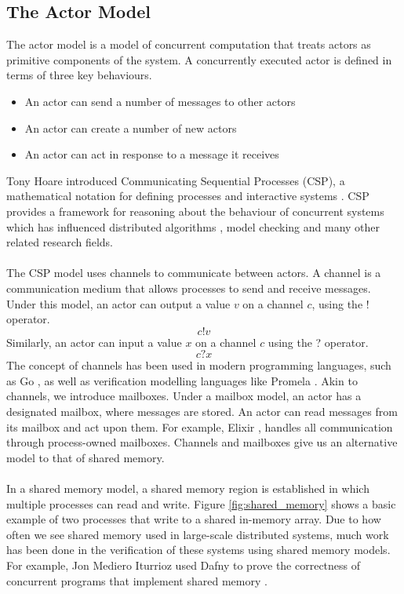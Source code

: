\subsection{The Actor Model}
The actor model \cite{actors} is a model of concurrent computation that treats actors as primitive components of the system. A concurrently executed actor is defined in terms of three key behaviours.
\begin{itemize}
    \item An actor can send a number of messages to other actors
    \item An actor can create a number of new actors
    \item An actor can act in response to a message it receives
\end{itemize}
Tony Hoare introduced Communicating Sequential Processes (CSP), a mathematical notation for defining processes and interactive systems \cite{csp_paper}. CSP provides a framework for reasoning about the behaviour of concurrent systems which has influenced distributed algorithms \cite{distributed_algorithms_na_lynch}, model checking \cite{model_checking} and many other related research fields.
\\ \\
The CSP model uses channels to communicate between actors. A channel is a communication medium that allows processes to send and receive messages. Under this model, an actor can output a value $v$ on a channel $c$, using the ! operator.
\[
c!v
\]
Similarly, an actor can input a value $x$ on a channel $c$ using the ? operator.
\[
c?x
\]
The concept of channels has been used in modern programming languages, such as Go \cite{go}, as well as verification modelling languages like Promela \cite{promela}. Akin to channels, we introduce mailboxes. Under a mailbox model, an actor has a designated mailbox, where messages are stored. An actor can read messages from its mailbox and act upon them. For example, Elixir \cite{elixir}, handles all communication through process-owned mailboxes. Channels and mailboxes give us an alternative model to that of shared memory.
\\ \\
In a shared memory model, a shared memory region is established in which multiple processes can read and write. Figure \ref{fig:shared_memory} shows a basic example of two processes that write to a shared in-memory array. Due to how often we see shared memory used in large-scale distributed systems, much work has been done in the verification of these systems using shared memory models. For example, Jon Mediero Iturrioz used Dafny \cite{dafny} to prove the correctness of concurrent programs that implement shared memory \cite{shared_memory_verification}. 
